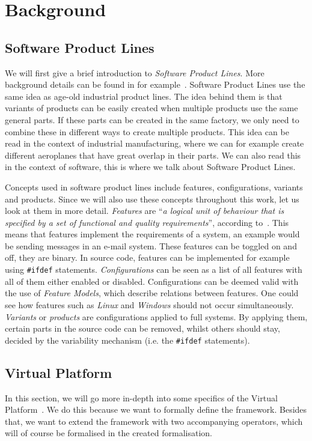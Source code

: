 \chapter{Background}\label{sec:background}
\section{Software Product Lines}
We will first give a brief introduction to \emph{Software Product Lines}.
More background details can be found in for example~\cite{van2001notion, apel2013software, bosch2000design}.
Software Product Lines use the same idea as age-old industrial product lines.
The idea behind them is that variants of products can be easily created when 
multiple products use the same general parts. If these parts can be created
in the same factory, we only need to combine these in different ways to create
multiple products. This idea can be read in the context of industrial
manufacturing, where we can for example create different aeroplanes that have
great overlap in their parts. We can also read this in the context of software,
this is where we talk about Software Product Lines.

Concepts used in software product lines include features, configurations,
variants and products. Since we will also use these concepts throughout this
work, let us look at them in more detail. \emph{Features} are ``\emph{a logical unit of
behaviour that is specified by a set of functional and quality requirements}'',
according to~\cite{bosch2000design}. This means that features implement the requirements
of a system, an example would be sending messages in an e-mail system. These features
can be toggled on and off, they are binary. In source code, features can be implemented
for example using \texttt{\#ifdef} statements. \emph{Configurations} can be seen as a
list of all features with all of them either enabled or disabled. Configurations can
be deemed valid with the use of \emph{Feature Models}, which describe relations between
features. One could see how features such as \emph{Linux} and \emph{Windows} should not
occur simultaneously. \emph{Variants} or \emph{products} are configurations applied to
full systems. By applying them, certain parts in the source code can be removed, whilst
others should stay, decided by the variability mechanism (i.e. the \texttt{\#ifdef} 
statements).

\section{Virtual Platform}\label{sec:background:vp}
In this section, we will go more in-depth into some specifics of the Virtual
Platform~\cite{mahmood2021}. We do this because we want to formally define
the framework. Besides that, we want to extend the framework
with two accompanying operators, which will of course be formalised in the
created formalisation. 

